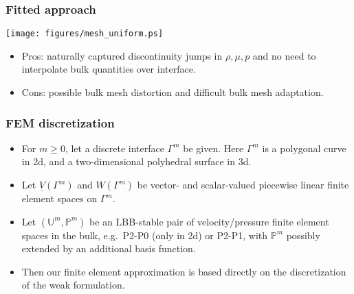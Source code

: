 \documentclass{beamer}
\newcommand{\Vh}{\underline{V}(\Gamma^m)}
\newcommand{\Wh}{W(\Gamma^m)}
\newcommand{\uspace}{\mathbb{U}}
\newcommand{\pspace}{\mathbb{P}}
\begin{document}
\begin{frame}
\frametitle{Fitted approach}

\centering
\texttt{[image: figures/mesh\_uniform.ps]}

\pause

\begin{itemize}
\item Pros: naturally captured discontinuity jumps in $\rho, \mu, p$ and no need
to interpolate bulk quantities over interface.

\pause

\item Cons: possible bulk mesh distortion and difficult bulk mesh adaptation.
\end{itemize}
\end{frame}

\begin{frame}
\frametitle{FEM discretization}

\begin{itemize}
\item For $m\geq 0$, let a discrete interface $\Gamma^m$ be given. Here
$\Gamma^m$ is a polygonal curve in 2d, and a two-dimensional polyhedral surface
in 3d.

\pause

\item Let $\Vh$ and $\Wh$ be vector- and scalar-valued piecewise linear finite
element spaces on $\Gamma^m$.

\pause

\item Let $(\uspace^m, \pspace^m)$ be an LBB-stable pair of velocity/pressure
finite element spaces in the bulk, e.g.\ P2-P0 (only in 2d) or P2-P1, with
$\pspace^m$ possibly extended by an additional basis function.

\pause

\item Then our finite element approximation is based directly on the
discretization of the weak formulation.
\end{itemize}
\end{frame}
\end{document}
